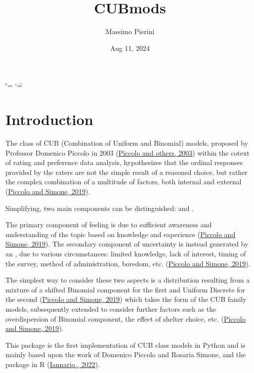 \documentclass[letterpaper,10pt,english]{sphinxmanual}
\title{CUBmods}
\date{Aug 11, 2024}
\author{Massimo Pierini}
\begin{document}
\ifdefined\shorthandoff
  \ifnum\catcode`\=\string=\active\shorthandoff{=}\fi
  \ifnum\catcode`\"=\active{}\fi
\fi

\pagestyle{empty}
\sphinxmaketitle
\pagestyle{plain}
\sphinxtableofcontents
\pagestyle{normal}
\label{\detokenize{index::doc}}


\sphinxstepscope


\chapter{Introduction}
\label{\detokenize{intro:introduction}}\label{\detokenize{intro::doc}}
\sphinxAtStartPar
The class of CUB (Combination of Uniform and Binomial) models, proposed by Professor Domenico Piccolo in
2003 (\hyperlink{cite.intro:id17}{Piccolo and others, 2003}) within the cotext of rating and preference data analysis, hypothesizes that
the ordinal responses provided by the raters are not the simple result of a reasoned choice, but rather the
complex combination of a multitude of factors, both internal and external (\hyperlink{cite.intro:id16}{Piccolo and Simone, 2019}).

\sphinxAtStartPar
Simplifying, two main components can be distinguished:
 and .

\sphinxAtStartPar
The primary component of feeling
is due to sufficient awareness and understanding of the topic based on
knowledge and experience (\hyperlink{cite.intro:id16}{Piccolo and Simone, 2019}).
The secondary component of uncertainty is instead generated by an , due to
various circumstances: limited knowledge, lack of interest, timing of the survey, method of
administration, boredom, etc. (\hyperlink{cite.intro:id16}{Piccolo and Simone, 2019}).

\sphinxAtStartPar
The simplest way to consider these
two aspects is a distribution resulting from a
mixture of a shifted Binomial component for the first and Uniform Discrete for the
second (\hyperlink{cite.intro:id16}{Piccolo and Simone, 2019}) which takes the form of the CUB family models, subsequently
extended to consider further factors such as the overdispersion of
Binomial component, the effect of shelter choice, etc. (\hyperlink{cite.intro:id16}{Piccolo and Simone, 2019}).

\sphinxAtStartPar
This package is the first implementation of CUB class models in Python and is mainly based upon
the work of Domenico Piccolo and Rosaria Simone, and the  package in R (\hyperlink{cite.intro:id31}{Iannario , 2022}).
\end{document}
